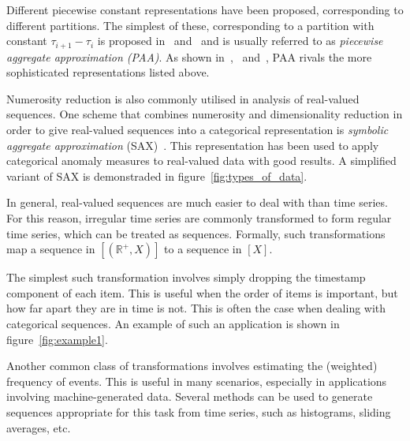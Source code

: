 Different piecewise constant representations have been proposed, corresponding to different partitions. The simplest of these, corresponding to a partition with constant $\tau_{i+1} - \tau_i$ is proposed in~\cite{keogh4} and~\cite{faloutsos2} and is usually referred to as \emph{piecewise aggregate approximation (PAA)}. As shown in~\cite{keogh5},~\cite{keogh3} and~\cite{faloutsos2}, PAA rivals the more sophisticated representations listed above.

Numerosity reduction is also commonly utilised in analysis of real-valued sequences. One scheme that combines numerosity and dimensionality reduction in order to give real-valued sequences into a categorical representation is \emph{symbolic aggregate approximation} (SAX)~\cite{sax}. This representation has been used to apply categorical anomaly measures to real-valued data with good results. A simplified variant of SAX is demonstraded in figure~\ref{fig:types_of_data}.

In general, real-valued sequences are much easier to deal with than time series. For this reason, irregular time series are commonly transformed to form regular time series, which can be treated as sequences. Formally, such transformations map a sequence in $[(\mathbb{R}^+, X)]$ to a sequence in $[X]$.

The simplest such transformation involves simply dropping the timestamp component of each item. This is useful when the order of items is important, but how far apart they are in time is not. This is often the case when dealing with categorical sequences. An example of such an application is shown in figure~\ref{fig:example1}.

Another common class of transformations involves estimating the (weighted) frequency of events. This is useful in many scenarios, especially in applications involving machine-generated data. Several methods can be used to generate sequences appropriate for this task from time series, such as histograms, sliding averages, etc.



